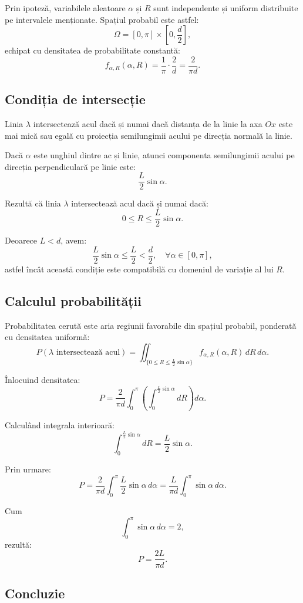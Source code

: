 \documentclass[12pt]{article}
\begin{document}
Prin ipoteză, variabilele aleatoare $\alpha$ și $R$ sunt independente și uniform distribuite pe intervalele menționate. Spațiul probabil este astfel:
\[
\Omega=[0,\pi]\times\left[0,\frac{d}{2}\right],
\]
echipat cu densitatea de probabilitate constantă:
\[
f_{\alpha,R}(\alpha,R)=\frac{1}{\pi}\cdot\frac{2}{d}=\frac{2}{\pi d}.
\]

\subsection{Condiția de intersecție}

Linia $\lambda$ intersectează acul dacă și numai dacă distanța de la linie la axa $Ox$ este mai mică sau egală cu proiecția semilungimii acului pe direcția normală la linie.

Dacă $\alpha$ este unghiul dintre ac și linie, atunci componenta semilungimii acului pe direcția perpendiculară pe linie este:
\[
\frac{L}{2}\sin\alpha.
\]

Rezultă că linia $\lambda$ intersectează acul dacă și numai dacă:
\[
0 \le R \le \frac{L}{2}\sin\alpha.
\]

Deoarece $L<d$, avem:
\[
\frac{L}{2}\sin\alpha \le \frac{L}{2} < \frac{d}{2},
\quad \forall \alpha\in[0,\pi],
\]
astfel încât această condiție este compatibilă cu domeniul de variație al lui $R$.

\subsection{Calculul probabilității}

Probabilitatea cerută este aria regiunii favorabile din spațiul probabil, ponderată cu densitatea uniformă:
\[
P(\lambda \text{ intersectează acul})
=
\iint_{\{0\le R\le \frac{L}{2}\sin\alpha\}}
f_{\alpha,R}(\alpha,R)\,dR\,d\alpha.
\]

Înlocuind densitatea:
\[
P
=
\frac{2}{\pi d}
\int_0^\pi
\left(
\int_0^{\frac{L}{2}\sin\alpha} dR
\right)
d\alpha.
\]

Calculând integrala interioară:
\[
\int_0^{\frac{L}{2}\sin\alpha} dR
=
\frac{L}{2}\sin\alpha.
\]

Prin urmare:
\[
P
=
\frac{2}{\pi d}
\int_0^\pi
\frac{L}{2}\sin\alpha\,d\alpha
=
\frac{L}{\pi d}
\int_0^\pi \sin\alpha\,d\alpha.
\]

Cum
\[
\int_0^\pi \sin\alpha\,d\alpha = 2,
\]
rezultă:
\[
\boxed{
P = \frac{2L}{\pi d}
}.
\]

\subsection{Concluzie}
\end{document}
